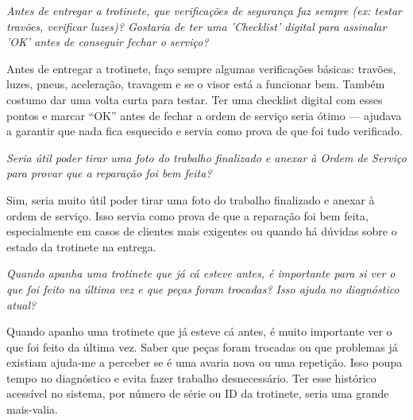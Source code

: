 \documentclass[11pt,a4paper]{article}
\newcommand{\pergunta}[1]{\item[P:] \textit{#1}}
\newcommand{\resposta}[1]{\item[R:] #1}
\begin{document}
\begin{transcription}
		\pergunta{Antes de entregar a trotinete, que verificações de segurança faz sempre (ex: testar travões, verificar luzes)? Gostaria de ter uma 'Checklist' digital para assinalar 'OK' antes de conseguir fechar o serviço?}
		\resposta{Antes de entregar a trotinete, faço sempre algumas verificações básicas: travões, luzes, pneus, aceleração, travagem e se o visor está a funcionar bem. Também costumo dar uma volta curta para testar. Ter uma checklist digital com esses pontos e marcar “OK” antes de fechar a ordem de serviço seria ótimo — ajudava a garantir que nada fica esquecido e servia como prova de que foi tudo verificado.}
		
		\pergunta{Seria útil poder tirar uma foto do trabalho finalizado e anexar à Ordem de Serviço para provar que a reparação foi bem feita?}
		\resposta{Sim, seria muito útil poder tirar uma foto do trabalho finalizado e anexar à ordem de serviço. Isso servia como prova de que a reparação foi bem feita, especialmente em casos de clientes mais exigentes ou quando há dúvidas sobre o estado da trotinete na entrega.}
		
		\pergunta{Quando apanha uma trotinete que já cá esteve antes, é importante para si ver o que foi feito na última vez e que peças foram trocadas? Isso ajuda no diagnóstico atual?}
		\resposta{Quando apanho uma trotinete que já esteve cá antes, é muito importante ver o que foi feito da última vez. Saber que peças foram trocadas ou que problemas já existiam ajuda-me a perceber se é uma avaria nova ou uma repetição. Isso poupa tempo no diagnóstico e evita fazer trabalho desnecessário. Ter esse histórico acessível no sistema, por número de série ou ID da trotinete, seria uma grande mais-valia.}
		
	\end{transcription}
	
	\vspace{0.8cm}
	
%	
	
\end{document}
